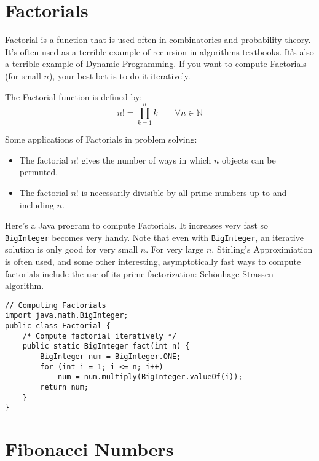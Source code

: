 \section{Factorials}
Factorial is a function that is used often in combinatorics and probability theory. It's often used as a terrible example of recursion in algorithms textbooks. It's also a terrible example of Dynamic Programming. If you want to compute Factorials (for small $n$), your best bet is to do it iteratively.

The Factorial function is defined by:
\[n!=\displaystyle\prod_{k=1}^n k \qquad \forall n \in \mathbb{N}\]

Some applications of Factorials in problem solving:
\begin{itemize}
\item The factorial $n!$ gives the number of ways in which $n$ objects can be permuted.
\item The factorial $n!$ is necessarily divisible by all prime numbers up to and including $n$.
\end{itemize}

Here's a Java program to compute Factorials. It increases very fast so \texttt{BigInteger} becomes very handy. Note that even with \texttt{BigInteger}, an iterative solution is only good for very small $n$. For very large $n$, Stirling's Approximiation is often used, and some other interesting, asymptotically fast ways to compute factorials include the use of its prime factorization: Sch\"{o}nhage-Strassen algorithm.

\lstset{
	language=java,
	tabsize=4,
	basicstyle=\footnotesize,
}
\begin{lstlisting}
// Computing Factorials
import java.math.BigInteger;
public class Factorial {
	/* Compute factorial iteratively */
	public static BigInteger fact(int n) {
		BigInteger num = BigInteger.ONE;
		for (int i = 1; i <= n; i++)
			num = num.multiply(BigInteger.valueOf(i));
		return num;
	}
}
\end{lstlisting}


\section{Fibonacci Numbers}

